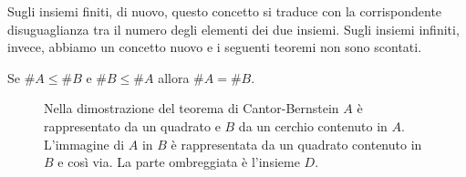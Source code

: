 \documentclass[italian,a4paper,twosides,headinclude]{scrbook}
\begin{document}
Sugli insiemi finiti, di nuovo, questo concetto
si traduce con la corrispondente
disuguaglianza tra il numero degli elementi dei due insiemi.
Sugli insiemi infiniti, invece, abbiamo un concetto nuovo e i seguenti teoremi
non sono scontati.

\begin{theorem}
Se $\#A \le \#B$ e $\#B \le \#A$ allora $\#A = \#B$.
\end{theorem}
%
\begin{figure}
  \centering
  
  \caption{
  Nella dimostrazione del teorema di Cantor-Bernstein
  $A$ è rappresentato da un quadrato e $B$ da un cerchio contenuto
  in $A$. L'immagine di $A$ in $B$ è rappresentata da un quadrato contenuto
  in $B$ e così via. La parte ombreggiata è l'insieme $D$.
  }
  \label{fig:omotetia}
\end{figure}
%
\end{document}
